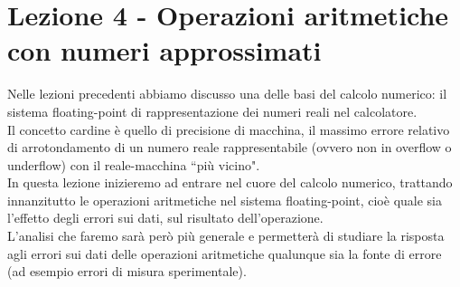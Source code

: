 \section{Lezione 4 - Operazioni aritmetiche con numeri approssimati}
Nelle lezioni precedenti abbiamo discusso una delle basi del calcolo numerico: il sistema floating-point di rappresentazione dei numeri reali nel calcolatore. \\
Il concetto cardine è quello di precisione di macchina, il massimo errore relativo di arrotondamento di un numero reale rappresentabile (ovvero non in overflow o underflow) con il reale-macchina ``più vicino".\\
In questa lezione inizieremo ad entrare nel cuore del calcolo numerico, trattando innanzitutto le operazioni aritmetiche nel sistema floating-point, cioè quale sia l'effetto degli errori sui dati, sul risultato dell'operazione.\\
L'analisi che faremo sarà però più generale e permetterà di studiare la risposta agli errori sui dati delle operazioni aritmetiche qualunque sia la fonte di errore (ad esempio errori di misura sperimentale).

